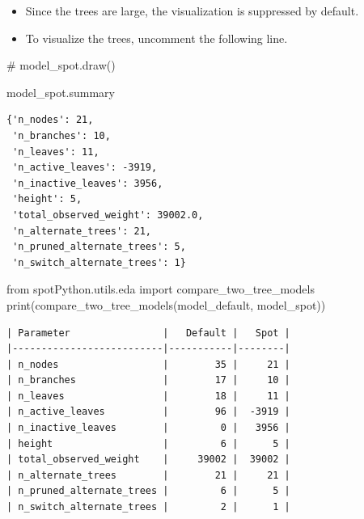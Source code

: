 \documentclass[
  letterpaper,
  DIV=11,
  numbers=noendperiod]{scrreprt}
\newenvironment{Shaded}{\begin{snugshade}}{\end{snugshade}}
\newcommand{\BuiltInTok}[1]{\textcolor[rgb]{0.00,0.23,0.31}{#1}}
\newcommand{\CommentTok}[1]{\textcolor[rgb]{0.37,0.37,0.37}{#1}}
\newcommand{\ImportTok}[1]{\textcolor[rgb]{0.00,0.46,0.62}{#1}}
\newcommand{\NormalTok}[1]{\textcolor[rgb]{0.00,0.23,0.31}{#1}}
\providecommand{\tightlist}{%
  \setlength{\itemsep}{0pt}\setlength{\parskip}{0pt}}\usepackage{longtable,booktabs,array}
\begin{document}
\begin{tcolorbox}[enhanced jigsaw, left=2mm, title=\textcolor{quarto-callout-caution-color}{\faFire}\hspace{0.5em}{Caution: Large Trees}, bottomrule=.15mm, titlerule=0mm, breakable, rightrule=.15mm, toprule=.15mm, coltitle=black, colbacktitle=quarto-callout-caution-color!10!white, leftrule=.75mm, arc=.35mm, colframe=quarto-callout-caution-color-frame, bottomtitle=1mm, colback=white, opacitybacktitle=0.6, toptitle=1mm, opacityback=0]

\begin{itemize}
\tightlist
\item
  Since the trees are large, the visualization is suppressed by default.
\item
  To visualize the trees, uncomment the following line.
\end{itemize}

\end{tcolorbox}

\begin{Shaded}
\begin{Highlighting}[]
\CommentTok{\# model\_spot.draw()}
\end{Highlighting}
\end{Shaded}

\begin{Shaded}
\begin{Highlighting}[]
\NormalTok{model\_spot.summary}
\end{Highlighting}
\end{Shaded}

\begin{verbatim}
{'n_nodes': 21,
 'n_branches': 10,
 'n_leaves': 11,
 'n_active_leaves': -3919,
 'n_inactive_leaves': 3956,
 'height': 5,
 'total_observed_weight': 39002.0,
 'n_alternate_trees': 21,
 'n_pruned_alternate_trees': 5,
 'n_switch_alternate_trees': 1}
\end{verbatim}

\begin{Shaded}
\begin{Highlighting}[]
\ImportTok{from}\NormalTok{ spotPython.utils.eda }\ImportTok{import}\NormalTok{ compare\_two\_tree\_models}
\BuiltInTok{print}\NormalTok{(compare\_two\_tree\_models(model\_default, model\_spot))}
\end{Highlighting}
\end{Shaded}

\begin{verbatim}
| Parameter                |   Default |   Spot |
|--------------------------|-----------|--------|
| n_nodes                  |        35 |     21 |
| n_branches               |        17 |     10 |
| n_leaves                 |        18 |     11 |
| n_active_leaves          |        96 |  -3919 |
| n_inactive_leaves        |         0 |   3956 |
| height                   |         6 |      5 |
| total_observed_weight    |     39002 |  39002 |
| n_alternate_trees        |        21 |     21 |
| n_pruned_alternate_trees |         6 |      5 |
| n_switch_alternate_trees |         2 |      1 |
\end{verbatim}
\end{document}
